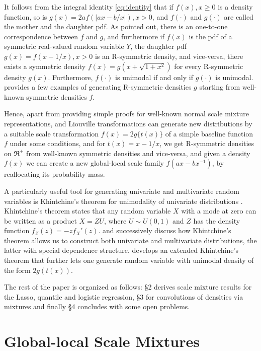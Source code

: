 \documentclass[lineno]{biometrika}
\begin{document}
It follows from the integral identity \eqref{eq:identity} that if $f(x), x \geq 0$ is a density function, so is $g(x) = 2a f(|ax-b/x|), x >0$, and $f(\cdot)$ and $g(\cdot)$ are called the mother and the daughter pdf. As \cite{chaubey2010reciprocal} pointed out, there is an one-to-one correspondence between $f$ and $g$, and furthermore if $f(x)$ is the pdf of a symmetric real-valued random variable $Y$, the daughter pdf $g(x) = f(x-1/x), x>0$ is an R-symmetric density, and vice-versa, there exists a symmetric density $f(x) = g(x+\sqrt{1+x^2})$ for every R-symmetric density $g(x)$. Furthermore, $f(\cdot)$ is unimodal if and only if $g(\cdot)$ is unimodal. \cite{chaubey2010reciprocal} provides a few examples of generating R-symmetric densities $g$ starting from well-known symmetric densities $f$. 

Hence, apart from providing simple proofs for well-known normal scale mixture representations, \CS and Liouville transformations can generate new distributions by a suitable scale transformation $f(x) = 2g\{ t(x) \}$ of a simple baseline function $f$ under some conditions, and for $t(x) = x - 1/x$, we get R-symmetric densities on $\Re^+$ from well-known symmetric densities and vice-versa, and given a density $f(x)$ we can create a new global-local scale family $f(ax-bx^{-1})$, by reallocating its probability mass. 

A particularly useful tool for generating univariate and multivariate random variables is Khintchine's theorem for unimodality of univariate distributions \citep{bryson1982constructing}. Khintchine's theorem states that any random variable $X$ with a mode at zero can be written as a product $X = ZU$, where $U \sim U(0,1)$ and $Z$ has the density function $f_Z(z) = -zf_{X}'(z)$. \citet{bryson1982constructing} and successively \citet{jones2010distributions,jones2012khintchine} discuss how Khintchine's theorem allows us to construct both univariate and multivariate distributions, the latter with special dependence structure.\cite{jones2014generating} develops an extended Khintchine's theorem that further lets one generate random variable with unimodal density of the form $2g(t(x))$. 

The rest of the paper is organized as follows: \S 2 derives scale mixture results for the Lasso, quantile and logistic regression, \S 3 for convolutions of densities via mixtures and finally \S 4 concludes with some open problems. 

\section{Global-local Scale Mixtures}
\end{document}
